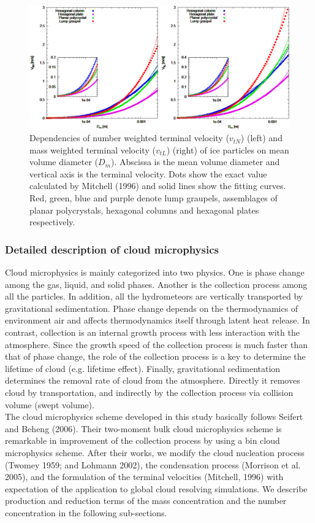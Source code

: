 \begin{figure}[]
\begin{center}
\includegraphics[scale=0.4]{./figure/D_vt_sn13-ice-1.eps}
\end{center}
\caption{Dependencies of number weighted terminal velocity ($v_{tN}$) (left) and mass weighted terminal velocity ($v_{tL}$) (right) of ice particles on mean volume diameter ($D_{m}$). Abscissa is the mean volume diameter and vertical axis is the terminal velocity. Dots show the exact value calculated by Mitchell (1996) and solid lines show the fitting curves. Red, green, blue and purple denote lump graupels, assemblages of planar polycrystals, hexagonal columns and hexagonal plates respectively.}
\label{figsn2-14}
\end{figure}

\subsubsection{Detailed description of cloud microphysics}
Cloud microphysics is mainly categorized into two physics. One is phase change among the gas, liquid, and solid phases. Another is the collection process among all the particles. In addition, all the hydrometeors are vertically transported by gravitational sedimentation. Phase change depends on the thermodynamics of environment air and affects thermodynamics itself through latent heat release. In contrast, collection is an internal growth process with less interaction with the atmosphere. Since the growth speed of the collection process is much faster than that of phase change, the role of the collection process is a key to determine the lifetime of cloud (e.g. lifetime effect). Finally, gravitational sedimentation determines the removal rate of cloud from the atmosphere. Directly it removes cloud by transportation, and indirectly by the collection process via collision volume (swept volume).\\
The cloud microphysics scheme developed in this study basically follows Seifert and Beheng (2006). Their two-moment bulk cloud microphysics scheme is remarkable in improvement of the collection process by using a bin cloud microphysics scheme. After their works, we modify the cloud nucleation process (Twomey 1959; and Lohmann 2002), the condensation process (Morrison et al. 2005), and the formulation of the terminal velocities (Mitchell, 1996) with expectation of the application to global cloud resolving simulations. We describe production and reduction terms of the mass concentration and the number concentration in the following sub-sections. 

